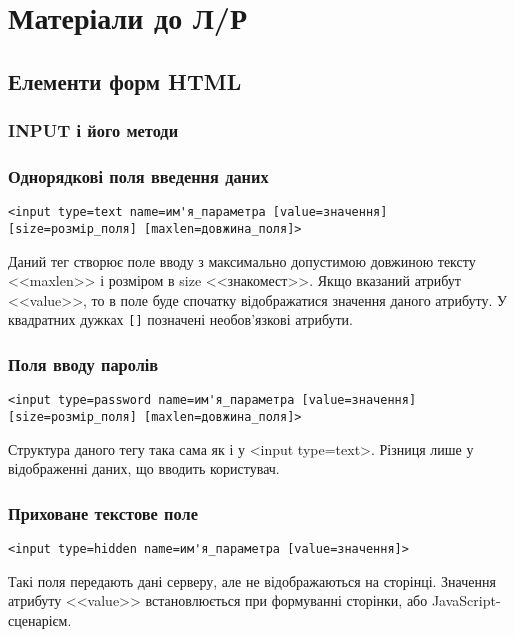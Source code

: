 \chapter{Матеріали до Л/Р }
\section{Елементи форм HTML}
\subsection{INPUT і його методи}
\label{inp-tag:app}
\subsection*{Однорядкові поля введення даних}

\begin{verbatim}
<input type=text name=им'я_параметра [value=значення] 
[size=розмір_поля] [maxlen=довжина_поля]>
\end{verbatim}

Даний тег створює поле вводу з максимально допустимою довжиною тексту <<maxlen>> і розміром в size <<знакомест>>. Якщо вказаний атрибут <<value>>, то в поле буде спочатку відображатися значення даного атрибуту. У квадратних дужках \verb'[]' позначені необов'язкові атрибути.

\subsection*{Поля вводу паролів}

\begin{verbatim}
<input type=password name=им'я_параметра [value=значення] 
[size=розмір_поля] [maxlen=довжина_поля]>
\end{verbatim}

Структура даного тегу така сама як і у <input type=text>. Різниця лише у відображенні даних, що вводить користувач.


\subsection*{Приховане текстове поле}

\begin{verbatim}
<input type=hidden name=им'я_параметра [value=значення]>
\end{verbatim}

Такі поля передають дані серверу, але не відображаються на сторінці. Значення атрибуту <<value>> встановлюється при формуванні сторінки, або JavaScript-сценарієм.

